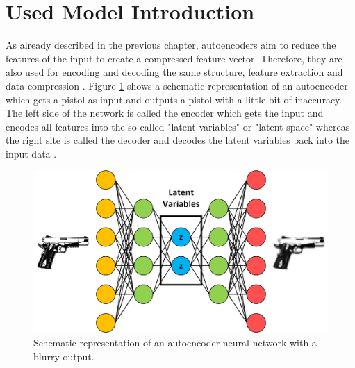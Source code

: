 \documentclass[MGS,Master,english]{twbook}%
\begin{document}
\section{Used Model Introduction}
As already described in the previous chapter, autoencoders aim to reduce the features of the input to create a compressed feature vector. Therefore, they are also used for encoding and decoding the same structure, feature extraction and data compression \cite{ml::book::nnProgrammingTF}. Figure \ref{fig::autoencoder} shows a schematic representation of an autoencoder which gets a pistol as input and outputs a pistol with a little bit of inaccuracy. The left side of the network is called the encoder which gets the input and encodes all features into the so-called "latent variables" or "latent space" whereas the right site is called the decoder and decodes the latent variables back into the input data \cite{ml::book::nnProgrammingTF}. 
\begin{figure}[!htbp]
	\centering
	\includegraphics[width=0.9\linewidth]{PICs/NNs/autoencoder}
	\caption{Schematic representation of an autoencoder neural network with a blurry output.} \label{fig::autoencoder}
\end{figure}
\end{document}

